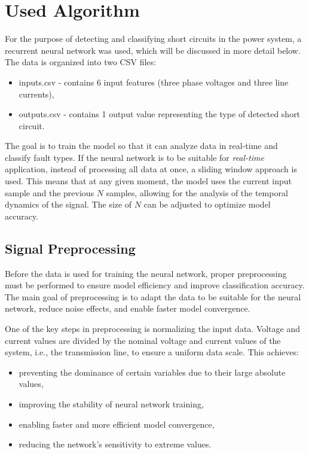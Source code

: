 \documentclass[11pt]{IEEEtran}
\begin{document}
\section{Used Algorithm}
For the purpose of detecting and classifying short circuits in the power system, a recurrent neural network was used, which will be discussed in more detail below. The data is organized into two CSV files:
\begin{itemize}
    \item inputs.csv - contains 6 input features (three phase voltages and three line currents),   
    \item outputs.csv - contains 1 output value representing the type of detected short circuit. 
\end{itemize}
The goal is to train the model so that it can analyze data in real-time and classify fault types.
If the neural network is to be suitable for \textit{real-time} application, instead of processing all data at once, a sliding window approach is used. This means that at any given moment, the model uses the current input sample and the previous $N$ samples, allowing for the analysis of the temporal dynamics of the signal. The size of $N$ can be adjusted to optimize model accuracy.

\subsection{Signal Preprocessing}
Before the data is used for training the neural network, proper preprocessing must be performed to ensure model efficiency and improve classification accuracy. The main goal of preprocessing is to adapt the data to be suitable for the neural network, reduce noise effects, and enable faster model convergence. 

One of the key steps in preprocessing is normalizing the input data. Voltage and current values are divided by the nominal voltage and current values of the system, i.e., the transmission line, to ensure a uniform data scale. This achieves:
\begin{itemize}
    \item preventing the dominance of certain variables due to their large absolute values,
    \item improving the stability of neural network training,
    \item enabling faster and more efficient model convergence,
    \item reducing the network's sensitivity to extreme values.
\end{itemize}
\end{document}
